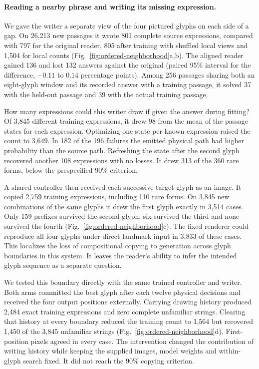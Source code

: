 \documentclass[12pt,a4paper]{article}
\providecommand{\DIFadd}[1]{{\protect\color{blue} \sf #1}} %
\begin{document}
\paragraph{\DIFadd{Reading a nearby phrase and writing its missing expression.}}
\DIFadd{We gave the writer a separate view of the four pictured glyphs on each side of a gap. On 26,213 new passages it wrote 801 complete source expressions, compared with 797 for the original reader, 805 after training with shuffled local views and 1,504 for local counts (Fig.~\ref{fig:ordered-neighborhood}a,b). The aligned reader gained 136 and lost 132 answers against the original (paired 95\% interval for the difference, $-0.11$ to $0.14$ percentage points). Among 256 passages sharing both an eight-glyph window and its recorded answer with a training passage, it solved 37 with the held-out passage and 39 with the actual training passage.
}

\DIFadd{How many expressions could this writer draw if given the answer during fitting? Of 3,845 different training expressions, it drew 98 from the mean of the passage states for each expression. Optimizing one state per known expression raised the count to 3,649. In 182 of the 196 failures the emitted physical path had higher probability than the source path. Refreshing the state after the second glyph recovered another 108 expressions with no losses. It drew 313 of the 360 rare forms, below the prespecified 90\% criterion.
}

\DIFadd{A shared controller then received each successive target glyph as an image. It copied 2,759 training expressions, including 110 rare forms. On 3,845 new combinations of the same glyphs it drew the first glyph exactly in 3,514 cases. Only 159 prefixes survived the second glyph, six survived the third and none survived the fourth (Fig.~\ref{fig:ordered-neighborhood}c). The fixed renderer could reproduce all four glyphs under direct landmark input in 3,833 of these cases. This localizes the loss of compositional copying to generation across glyph boundaries in this system. It leaves the reader's ability to infer the intended glyph sequence as a separate question.
}

\DIFadd{We tested this boundary directly with the same trained controller and writer. Both arms committed the best glyph after each twelve physical decisions and received the four output positions externally. Carrying drawing history produced 2,484 exact training expressions and zero complete unfamiliar strings. Clearing that history at every boundary reduced the training count to 1,564 but recovered 1,450 of the 3,845 unfamiliar strings (Fig.~\ref{fig:ordered-neighborhood}d). First-position pixels agreed in every case. The intervention changed the contribution of writing history while keeping the supplied images, model weights and within-glyph search fixed. It did not reach the 90\% copying criterion.
}
\end{document}
